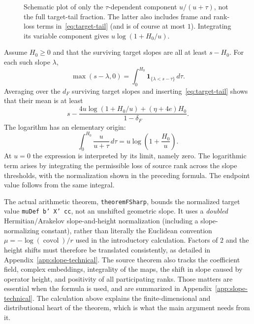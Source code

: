 \documentclass[11pt,openany,oneside]{scrbook}
\theoremstyle{definition}
\theoremstyle{remark}
\begin{document}
\begin{figure}[ht]
\centering
{}
\caption{Schematic plot of only the $\tau$-dependent component $u/(u+\tau)$, not the full target-tail fraction. The latter also includes frame and rank-loss terms in~\eqref{eq:target-tail} (and is of course at most $1$). Integrating its variable component gives $u\log(1+H_0/u)$.}
\label{fig:slope-tail}
\end{figure}

Assume $H_0\ge0$ and that the surviving target slopes are all at least $s-H_0$. For each such slope $\lambda$,
\[
\max(s-\lambda,0)=\int_0^{H_0}\mathbf1_{\{\lambda<s-\tau\}}\,d\tau.
\]
Averaging over the $d_F$ surviving target slopes and inserting~\eqref{eq:target-tail} shows that their mean is at least
\begin{equation}\label{eq:mean-slope-main}
s-\frac{4u\log(1+H_0/u)+(\eta+4e)H_0}{1-\delta_F}.
\end{equation}
The logarithm has an elementary origin:
\[
\int_0^{H_0}\frac{u}{u+\tau}\,d\tau=u\log\left(1+\frac{H_0}{u}\right).
\]
At $u=0$ the expression is interpreted by its limit, namely zero.  The logarithmic term arises by integrating the permissible loss of source rank across the slope thresholds, with the normalization shown in the preceding formula.  The endpoint value follows from the same integral.

The actual arithmetic theorem, \texttt{theoremFSharp}, bounds the normalized target value \texttt{muDef b' X' cc}, not an unshifted geometric slope. It uses a \emph{doubled} Hermitian/Arakelov slope-and-height normalization (including a slope-normalizing constant), rather than literally the Euclidean convention $\mu=-\log(\operatorname{covol})/r$ used in the introductory calculation. Factors of $2$ and the height shifts must therefore be translated consistently, as detailed in Appendix~\ref{app:slope-technical}. The source theorem also tracks the coefficient field, complex embeddings, integrality of the maps, the shift in slope caused by operator height, and positivity of all participating ranks.  Those matters are essential when the formula is used, and are summarized in Appendix~\ref{app:slope-technical}.  The calculation above explains the finite-dimensional and distributional heart of the theorem, which is what the main argument needs from it.
\end{document}
